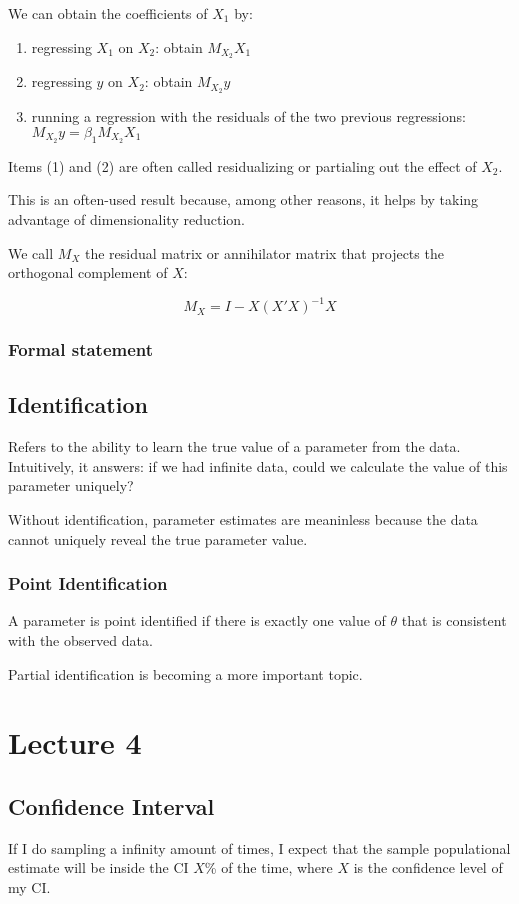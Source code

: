 \documentclass{article}
\begin{document}
We can obtain the coefficients of $X_1$ by:

\begin{enumerate}
    \item regressing $X_1$ on $X_2$: obtain $M_{X_2} X_1$
    \item regressing $y$ on $X_2$: obtain $M_{X_2} y$
    \item running a regression with the residuals of the two previous regressions: $M_{X_2} y = \beta_1 M_{X_2} X_1$
\end{enumerate}

Items (1) and (2) are often called residualizing or partialing out the effect of $X_2$.

This is an often-used result because, among other reasons, it helps by taking advantage of dimensionality reduction.

We call $M_X$ the residual matrix or annihilator matrix that projects the orthogonal complement of $X$:

$$
M_X = I - X (X'X)^{-1} X
$$

\subsubsection*{Formal statement}


\subsection*{Identification}
Refers to the ability to learn the true value of a parameter from the data. Intuitively, it answers: if we had infinite data, could we calculate the value of this parameter uniquely?

Without identification, parameter estimates are meaninless because the data cannot uniquely reveal the true parameter value.

\subsubsection{Point Identification}
A parameter is point identified if there is exactly one value of $\theta$ that is consistent with the observed data.

Partial identification is becoming a more important topic.

\section{Lecture 4}

\subsection{Confidence Interval}
If I do sampling a infinity amount of times, I expect that the sample populational estimate will be inside the CI $X$\% of the time, where $X$ is the confidence level of my CI.
\end{document}
